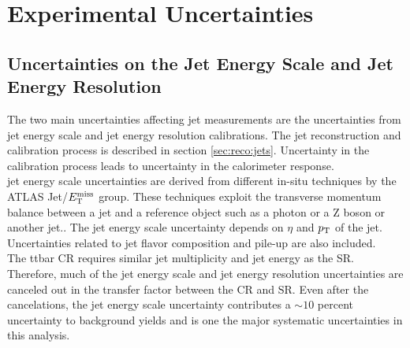 \section{Experimental Uncertainties}
\label{sec:ExpSystematics}


\subsection{Uncertainties on the Jet Energy Scale and Jet Energy Resolution } 

\indent The two main uncertainties affecting jet measurements are the uncertainties from jet energy scale and jet energy resolution calibrations. The jet reconstruction and calibration process is described in section \ref{sec:reco:jets}.  Uncertainty in the calibration process leads to uncertainty in the calorimeter response. \\

\indent jet energy scale uncertainties are derived from different in-situ techniques by the ATLAS Jet/$E_{\mathrm{T}}^{\mathrm{miss}}$ group.  These techniques exploit the transverse momentum balance between a jet and a reference object such as a photon or a Z boson or another jet.\cite{JES_dijet, JES_ZGamma}.  The jet energy scale uncertainty depends on $\eta$ and $p_{\mathrm{T}}$ of the jet.  Uncertainties related to jet flavor composition and pile-up are also included.  \\

\indent  The ttbar CR requires similar jet multiplicity and jet energy as the SR.  Therefore, much of the jet energy scale and jet energy resolution uncertainties are canceled out in the transfer factor between the CR and SR.  Even after the cancelations, the jet energy scale uncertainty contributes a $\sim 10$ percent uncertainty to background yields and is one the major systematic uncertainties in this analysis.  \\


